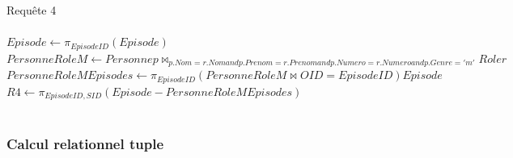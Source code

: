 \documentclass[10pt,a4paper]{article}
\begin{document}
\begin{list}{*}{}
\item Requête 4
\\ \\
$Episode \leftarrow \pi_{EpisodeID}(Episode)$\\
$PersonneRoleM \leftarrow Personne p \bowtie_{p.Nom = r.Nom and p.Prenom = r.Prenom and p.Numero = r.Numero and p.Genre='m'} Role r$\\
$PersonneRoleMEpisodes \leftarrow \pi_{EpisodeID} (PersonneRoleM \bowtie {OID=EpisodeID}) Episode$\\
$R4 \leftarrow \pi_{EpisodeID, SID}(Episode - PersonneRoleMEpisodes)$
\\
\\
\end{list}


\subsubsection{Calcul relationnel tuple}
\end{document}
